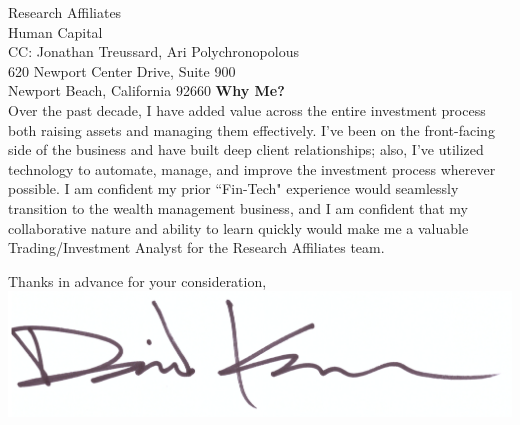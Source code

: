 \documentclass{letter}
\begin{document}
\begin{letter}{
  Research Affiliates \\
  Human Capital \\
  CC: Jonathan Treussard, Ari Polychronopolous \\
  620 Newport Center Drive, Suite 900 \\
  Newport Beach, California 92660
}
\textbf{Why Me?} \\
Over the past decade, I have added value across the entire investment process
both raising assets and managing them effectively. I've been on the front-facing
side of the business and have built deep client relationships; also, I've utilized
technology to automate, manage, and improve the investment process wherever
possible. I am confident my prior ``Fin-Tech" experience would seamlessly 
transition to the wealth management business, and I am confident that my collaborative
nature and ability to learn quickly would make me a valuable Trading/Investment Analyst
for the Research Affiliates team.
 
\closing{
  Thanks in advance for your consideration, \\
  \includegraphics[scale=0.33]{signature.png}
}

\end{letter}
\end{document}
